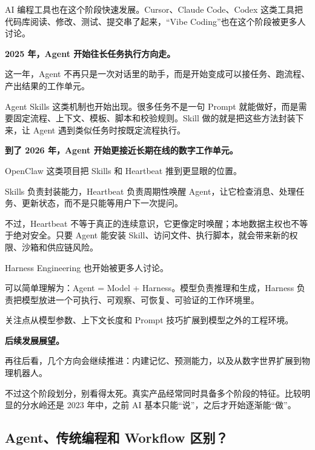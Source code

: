\documentclass[9pt,a4paper,twocolumn]{ctexart}
\begin{document}
AI 编程工具也在这个阶段快速发展。Cursor、Claude Code、Codex 这类工具把代码库阅读、修改、测试、提交串了起来，“Vibe Coding”也在这个阶段被更多人讨论。



\textbf{2025 年，Agent 开始往长任务执行方向走。}



这一年，Agent 不再只是一次对话里的助手，而是开始变成可以接任务、跑流程、产出结果的工作单元。



Agent Skills 这类机制也开始出现。很多任务不是一句 Prompt 就能做好，而是需要固定流程、上下文、模板、脚本和校验规则。Skill 做的就是把这些方法封装下来，让 Agent 遇到类似任务时按既定流程执行。



\textbf{到了 2026 年，Agent 开始更接近长期在线的数字工作单元。}



OpenClaw 这类项目把 Skills 和 Heartbeat 推到更显眼的位置。



Skills 负责封装能力，Heartbeat 负责周期性唤醒 Agent，让它检查消息、处理任务、更新状态，而不是只能等用户下一次提问。



不过，Heartbeat 不等于真正的连续意识，它更像定时唤醒；本地数据主权也不等于绝对安全。只要 Agent 能安装 Skill、访问文件、执行脚本，就会带来新的权限、沙箱和供应链风险。



Harness Engineering 也开始被更多人讨论。



可以简单理解为：Agent = Model + Harness。模型负责推理和生成，Harness 负责把模型放进一个可执行、可观察、可恢复、可验证的工作环境里。



关注点从模型参数、上下文长度和 Prompt 技巧扩展到模型之外的工程环境。



\textbf{后续发展展望。}



再往后看，几个方向会继续推进：内建记忆、预测能力，以及从数字世界扩展到物理机器人。



不过这个阶段划分，别看得太死。真实产品经常同时具备多个阶段的特征。比较明显的分水岭还是 2023 年中，之前 AI 基本只能“说”，之后才开始逐渐能“做”。



\subsection*{Agent、传统编程和 Workflow 区别？}
\end{document}
